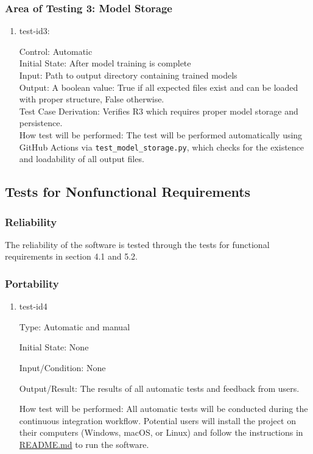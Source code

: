 \documentclass[12pt, titlepage]{article}
\begin{document}
\subsubsection{Area of Testing 3: Model Storage}

\begin{enumerate}
  \item{test-id3:\\}
  
  Control: Automatic\\
  Initial State: After model training is complete\\
  Input: Path to output directory containing trained models\\
  Output: A boolean value: True if all expected files exist and can be loaded with proper structure, False otherwise.\\
  Test Case Derivation: Verifies R3 which requires proper model storage and persistence.\\
  How test will be performed: The test will be performed automatically using GitHub Actions via \texttt{test\_model\_storage.py}, which checks for the existence and loadability of all output files.
\end{enumerate}


\subsection{Tests for Nonfunctional Requirements}

\subsubsection{Reliability}

The reliability of the software is tested through the tests for
functional requirements in section 4.1 and 5.2.

\subsubsection{Portability}

\begin{enumerate}

\item{test-id4\\}

Type: Automatic and manual
					
Initial State: None
					
Input/Condition: None
					
Output/Result: The results of all automatic tests and feedback from users.

How test will be performed: All automatic tests will be conducted during the continuous integration workflow. Potential users will install the project on their computers (Windows, macOS, or Linux) and follow the instructions in \href{https://github.com/V-AS/Two-tower-recommender-system/blob/main/README.md}{README.md} to run the software. 
\end{enumerate}
\end{document}
